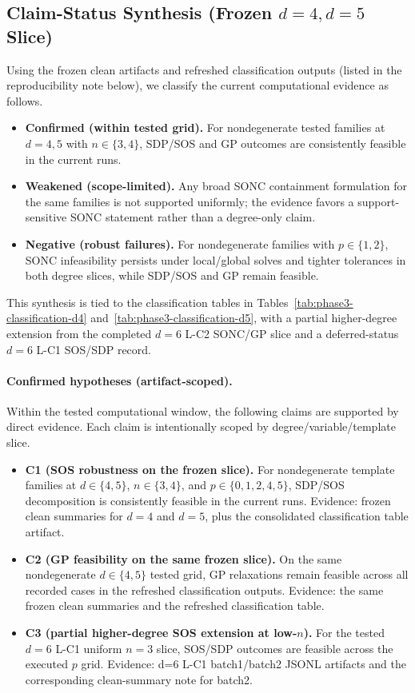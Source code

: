 \documentclass{article}
\begin{document}
\subsection*{Claim-Status Synthesis (Frozen $d=4,d=5$ Slice)}
Using the frozen clean artifacts and refreshed classification outputs
(listed in the reproducibility note below), we classify the current
computational evidence as follows.
\begin{itemize}
    \item \textbf{Confirmed (within tested grid).}
    For nondegenerate tested families at $d=4,5$ with $n \in \{3,4\}$, SDP/SOS and GP
    outcomes are consistently feasible in the current runs.
    \item \textbf{Weakened (scope-limited).}
    Any broad SONC containment formulation for the same families is not supported
    uniformly; the evidence favors a support-sensitive SONC statement rather than a
    degree-only claim.
    \item \textbf{Negative (robust failures).}
    For nondegenerate families with $p \in \{1,2\}$, SONC infeasibility persists under
    local/global solves and tighter tolerances in both degree slices, while SDP/SOS and
    GP remain feasible.
\end{itemize}
This synthesis is tied to the classification tables in
Tables~\ref{tab:phase3-classification-d4} and~\ref{tab:phase3-classification-d5},
with a partial higher-degree extension from the completed $d=6$ L-C2 SONC/GP slice and a
deferred-status $d=6$ L-C1 SOS/SDP record.

\paragraph{Confirmed hypotheses (artifact-scoped).}
Within the tested computational window, the following claims are supported by direct evidence.
Each claim is intentionally scoped by degree/variable/template slice.
\begin{itemize}
    \item \textbf{C1 (SOS robustness on the frozen slice).}
    For nondegenerate template families at $d\in\{4,5\}$, $n\in\{3,4\}$, and
    $p\in\{0,1,2,4,5\}$, SDP/SOS decomposition is consistently feasible in the current runs.
    Evidence: frozen clean summaries for $d=4$ and $d=5$, plus the consolidated
    classification table artifact.
    \item \textbf{C2 (GP feasibility on the same frozen slice).}
    On the same nondegenerate $d\in\{4,5\}$ tested grid, GP relaxations remain feasible
    across all recorded cases in the refreshed classification outputs.
    Evidence: the same frozen clean summaries and the refreshed classification table.
    \item \textbf{C3 (partial higher-degree SOS extension at low-$n$).}
    For the tested $d=6$ L-C1 uniform $n=3$ slice,
    SOS/SDP outcomes are feasible across the executed $p$ grid.
    Evidence: d=6 L-C1 batch1/batch2 JSONL artifacts and the corresponding
    clean-summary note for batch2.
\end{itemize}
\end{document}
